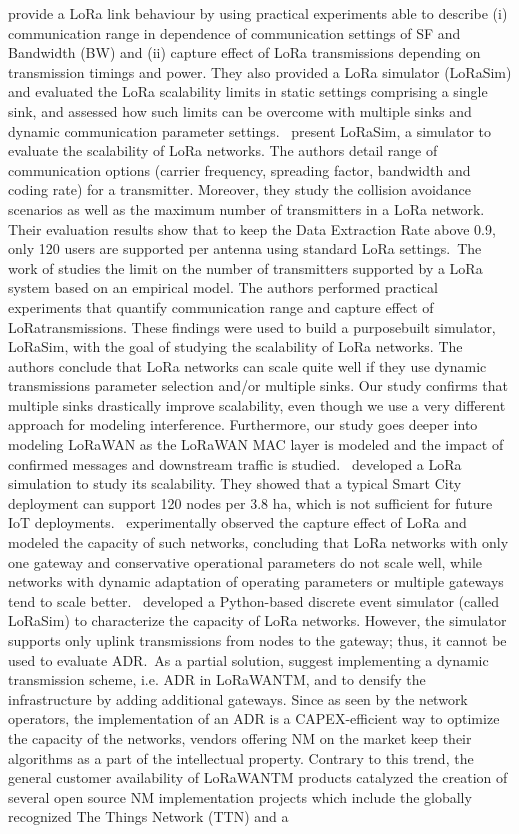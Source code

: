  \cite{bor_lora_2016-1}   \citet{bor_lora_2016} provide a LoRa link behaviour by using practical experiments able to describe (i) communication range in dependence of communication settings of SF and Bandwidth (BW) and (ii) capture effect of LoRa transmissions depending on transmission timings and power. They also provided a LoRa simulator (LoRaSim) and evaluated the LoRa scalability limits in static settings comprising a single sink, and assessed how such limits can be overcome with multiple sinks and dynamic communication parameter settings.~\citet{bor_lora_2016} present LoRaSim, a simulator to evaluate the scalability of LoRa networks. The authors detail range of communication options (carrier frequency, spreading factor, bandwidth and coding rate) for a transmitter. Moreover, they study the collision avoidance scenarios as well as the maximum number of transmitters in a LoRa network. Their evaluation results show that to keep the Data Extraction Rate above 0.9, only 120 users are supported per antenna using standard LoRa settings.~The work of \citet{bor_lora_2016} studies the limit on the number of transmitters supported by a LoRa system based on an empirical model. The authors performed practical experiments that quantify communication range and capture effect of LoRatransmissions. These findings were used to build a purposebuilt simulator, LoRaSim, with the goal of studying the scalability of LoRa networks. The authors conclude that LoRa networks can scale quite well if they use dynamic transmissions parameter selection and/or multiple sinks. Our study confirms that multiple sinks drastically improve scalability, even though we use a very different approach for modeling interference. Furthermore, our study goes deeper into modeling LoRaWAN as the LoRaWAN MAC layer is modeled and the impact of confirmed messages and downstream traffic is studied.~\citet{bor_lora_nodate} developed a LoRa simulation to study its scalability. They showed that a typical Smart City deployment can support 120 nodes per 3.8 ha, which is not sufficient for future IoT deployments.~\citet{bor_lora_2016} experimentally observed the capture effect of LoRa and modeled the capacity of such networks, concluding that LoRa networks with only one gateway and conservative operational parameters do not scale well, while networks with dynamic adaptation of operating parameters or multiple gateways tend to scale better.~\citet{bor_lora_2016} developed a Python-based discrete event simulator (called LoRaSim) to characterize the capacity of LoRa networks. However, the simulator supports only uplink transmissions from nodes to the gateway; thus, it cannot be used to evaluate ADR.~As a partial solution, \citet{bor_lora_2016} suggest implementing a dynamic transmission scheme, i.e. ADR in LoRaWANTM, and to densify the infrastructure by adding additional gateways. Since as seen by the network operators, the implementation of an ADR is a CAPEX-efficient way to optimize the capacity of the networks, vendors offering NM on the market keep their algorithms as a part of the intellectual property. Contrary to this trend, the general customer availability of LoRaWANTM products catalyzed the creation of several open source NM implementation projects which include the globally recognized The Things Network (TTN) and a 